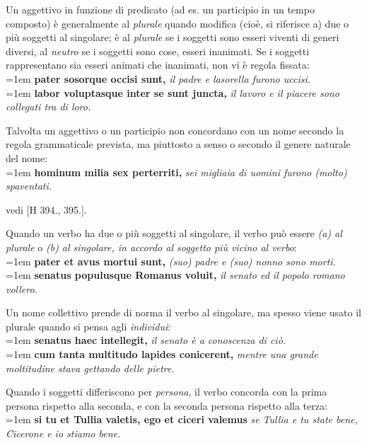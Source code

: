 \documentclass[nols]{tufte-handout}
\begin{document}
 Un aggettivo in funzione di predicato (ad es. un participio in un tempo composto) è generalmente al \textit{plurale} 
quando modifica (cioè, si riferisce a) due o più soggetti al singolare; è al \textit{plurale} se i soggetti sono esseri viventi di 
generi diversi, al \textit{neutro} se i soggetti sono cose, esseri inanimati. Se i soggetti rappresentano sia esseri animati che inanimati,
non vi è regola fissata:
\\
\vspace{0.5em}
\noindent \hangindent=1em \textbf{pater sosorque occisi sunt,} \textit{il padre e lasorella furono uccisi.}\\
\noindent \hangindent=1em \textbf{labor voluptasque inter se sunt juncta,} \textit{il lavoro e il piacere sono collegati tra di loro.}

 Talvolta un aggettivo o un participio non concordano con un nome secondo la regola grammaticale prevista, ma piuttosto a senso o secondo il genere naturale del nome:
\\
\vspace{0.5em}
\noindent \hangindent=1em \textbf{hominum milia sex perterriti,} \textit{sei migliaia di uomini furono (molto) spaventati.}

 vedi [H 394., 395.].

 Quando un verbo ha due o più soggetti al singolare, il verbo può essere \textit{(a) al plurale} o \textit{(b) al singolare, in accordo al soggetto più vicino al verbo}:
\\
\vspace{0.5em}
\noindent \hangindent=1em \textbf{pater et avus mortui sunt,} \textit{(suo) padre e (suo) nonno sono morti.}\\
\noindent \hangindent=1em \textbf{senatus populusque Romanus voluit,} \textit{il senato ed il popolo romano vollero.}

 Un nome collettivo prende di norma il verbo al singolare, ma spesso viene usato il plurale quando si pensa agli \textit{individui}:
\\
\vspace{0.5em}
\noindent \hangindent=1em \textbf{senatus haec intellegit,} \textit{il senato è a conoscenza di ciò.}\\
\noindent \hangindent=1em \textbf{cum tanta multitudo lapides conicerent,} \textit{mentre una grande moltitudine stava gettando delle pietre.}

 Quando i soggetti differiscono per \textit{persona}, il verbo concorda con la prima persona rispetto alla seconda, 
e con la seconda persona rispetto alla terza:
\\
\vspace{0.5em}
\noindent \hangindent=1em \textbf{si tu et Tullia valetis, ego et ciceri valemus} \textit{se Tullia e tu state bene, Cicerone e io stiamo bene.}
\end{document}
